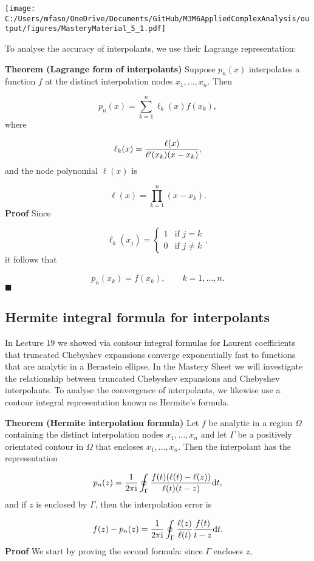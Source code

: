 \documentclass[12pt,a4paper]{article}
\def\D{ {\rm d} }
\def\I{ {\rm i} }
\def\dt{\D t}
\begin{document}
\texttt{[image: C:/Users/mfaso/OneDrive/Documents/GitHub/M3M6AppliedComplexAnalysis/output/figures/MasteryMaterial\_5\_1.pdf]}

To analyse the accuracy of interpolants, we use their Lagrange representation:

\textbf{Theorem (Lagrange form of interpolants)} Suppose $p_n(x)$ interpolates a function $f$ at the distinct interpolation nodes $x_1, \ldots, x_n$. Then

\[
p_n(x) = \sum_{k = 1}^{n} \ell_k(x)f(x_k),
\]
where

\[
\ell_k(x) = {\ell(x)\over \ell'(x_k) (x - x_k)},
\]
and the node polynomial $\ell(x)$ is

\[
\ell(x) = \prod_{k = 1}^{n}(x - x_k).
\]
\textbf{Proof} Since

\[
\ell_k(x_j) = \begin{cases}
1 & \text{if } j = k \\
0 & \text{if } j \neq k
\end{cases},
\]
it follows that

\[
p_n(x_k) = f(x_k), \qquad k = 1, \ldots, n.
\]
\ensuremath{\blacksquare}

\subsection{Hermite integral formula for interpolants}
In Lecture 19 we showed via contour integral formulas for Laurent coefficients that truncated Chebyshev expansions converge exponentially fast to functions that are analytic in a Bernstein ellipse. In the Mastery Sheet we will investigate the relationship between truncated Chebyshev expansions and Chebyshev interpolants. To analyse the convergence of interpolants, we likewise use a contour integral representation known as Hermite's formula.

\textbf{Theorem (Hermite interpolation formula)} Let $f$ be analytic in a region $\Omega$ containing the distinct interpolation nodes $x_1, \ldots, x_n$ and let $\Gamma$ be a positively orientated contour in $\Omega$ that encloses $x_1, \ldots, x_n$. Then the interpolant has the representation

\[
p_n(z) = {1 \over 2\pi\I} \oint_{\Gamma} {f(t)(\ell(t) - \ell(z))\over \ell(t)(t - z)}\dt,
\]
and if $z$ is enclosed by $\Gamma$, then the interpolation error is

\[
f(z) - p_n(z) = {1 \over 2\pi\I}\oint_{\Gamma} {\ell(z) \over \ell(t)}{f(t) \over t - z}\dt.
\]
\textbf{Proof} We start by proving the second formula: since $\Gamma$ encloses $z$,
\end{document}
